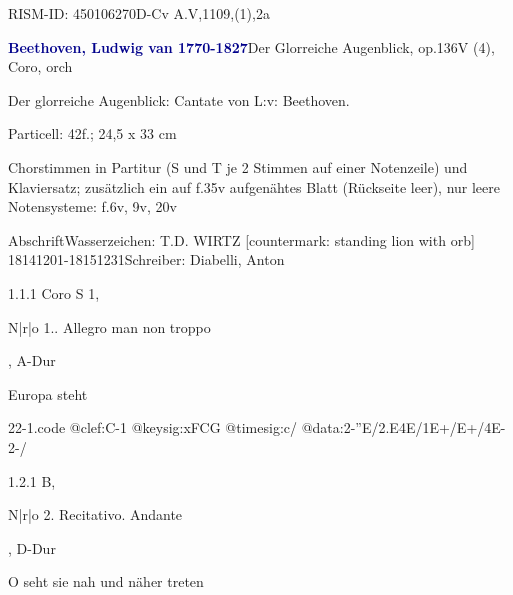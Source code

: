 \documentclass[a4paper, twocolumn, 11pt]{book}
\begin{document}
\par RISM-ID: 450106270\newline D-Cv  A.V,1109,(1),2a
\par \vspace{16pt} \textcolor{darkblue}{\textbf{Beethoven, Ludwig van  1770-1827}}\hfillplus{[22]}\newline Der Glorreiche Augenblick, op.136\newline V (4), Coro, orch
\par \begin{itshape} Der glorreiche Augenblick: Cantate von L:v: Beethoven.\end{itshape} 
\par \textcolor{darkblue}{}  Particell: 42f.; 24,5 x 33 cm\newline \begin{small} Chorstimmen in Partitur (S und T je 2 Stimmen auf einer Notenzeile) und Klaviersatz; zusätzlich ein auf f.35v aufgenähtes Blatt (Rückseite leer), nur leere Notensysteme: f.6v, 9v, 20v\end{small} \newline Abschrift\newline Wasserzeichen: T.D. WIRTZ [countermark: standing lion with orb]  18141201-18151231\newline Schreiber: Diabelli, Anton
\par 1.1.1  Coro S 1, \begin{itshape}N|r|o 1.. Allegro man non troppo\end{itshape}, A-Dur\newline \begin{footnotesize} Europa steht \end{footnotesize}  
\begin{filecontents*}{22-1.code}
@clef:C-1
@keysig:xFCG
@timesig:c/
@data:2-''E/2.E4E/1E+/E+/4E-2-/
\end{filecontents*}
\newline %
\par 1.2.1  B, \begin{itshape}N|r|o 2. Recitativo. Andante\end{itshape}, D-Dur\newline \begin{footnotesize} O seht sie nah und näher treten \end{footnotesize}  
\end{document}
